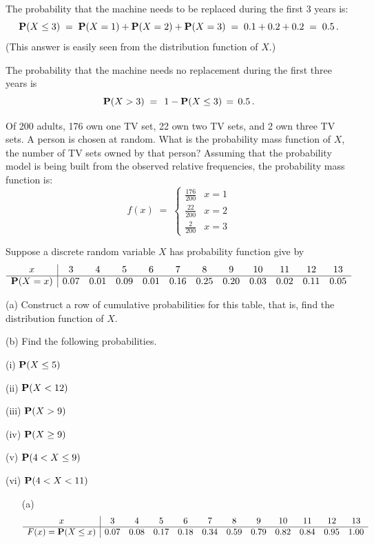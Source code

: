 \begin{ExerciseList}
\item The probability that the machine needs to be replaced during the
  first 3 years is:
$$\mathbf{P}(X \leq  3)\;=\;\mathbf{P}(X=1)+\mathbf{P}(X=2)+\mathbf{P}(X=3)\;=\;0.1+0.2+0.2\;=\;0.5\,.$$
(This answer is easily seen  from the distribution function of $X$.)
\item The probability that the machine needs no replacement during the
first three years is
\[ \mathbf{P}(X >  3)\;=\;\, 1-\mathbf{P}(X \leq  3)\,=\, 0.5 \,.\]
\ee

\Exercise
Of 200 adults, 176 own one TV set, 22 own two TV sets, and 2 own three TV sets.  
A person is chosen at random. What is the probability mass function of $X$,  the number of TV sets owned by that person?
\Answer
Assuming that the probability model is being built from the observed relative frequencies, the probability mass function is:
$$
f(x)\;=\;\begin{cases}\frac{176}{200}&x=1\\\frac{22}{200}&x=2\\\frac{2}{200}&x=3\end{cases}$$

\Exercise
Suppose a discrete random variable $X$ has probability function give by
$$\begin{array}{c|cccccccccccc}
x&3&4&5&6&7&8&9&10&11&12&13\\\hline
 \mathbf{P}(X=x)&0.07&0.01&0.09&0.01&0.16&0.25&0.20&0.03&0.02&0.11&0.05
\end{array}
$$
\be
\item[(a)] Construct a row of cumulative probabilities for this table, that
  is, find the distribution function of $X$.
\item[(b)] Find  the following  probabilities.
\be
\item[(i)]$\mathbf{P}(X\leq 5)$
\item[(ii)] $\mathbf{P}(X<12)$
\item[(iii)] $\mathbf{P}(X>9)$
\item[(iv)] $\mathbf{P}(X\geq 9)$
\item[(v)] $\mathbf{P}(4 <  X\leq 9)$
\item[(vi)] $\mathbf{P}(4<X<11)$
\ee
\ecols
\ee

\Answer
\begin{itemize}
\item[(a)]  $$\begin{array}{c|cccccccccccc}
x&3&4&5&6&7&8&9&10&11&12&13\\\hline
F(x) =\mathbf{P}(X\leq x)&0.07&0.08&0.17&0.18&0.34&0.59&0.79&0.82&0.84&0.95&1.00
\end{array}
$$


\end{itemize}
\end{ExerciseList}
